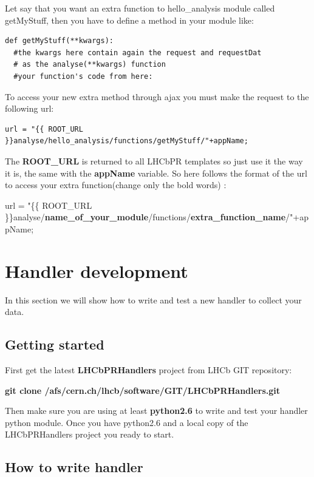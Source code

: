 \documentclass{lhcbnote}
\begin{document}
Let say that you want an extra function to hello\_analysis module called getMyStuff, then you have to define a method in your module like:

\begin{verbatim}
def getMyStuff(**kwargs):
  #the kwargs here contain again the request and requestDat
  # as the analyse(**kwargs) function
  #your function's code from here:
\end{verbatim}

To access your new extra method through ajax you must make the request to the following url:

\begin{verbatim}
url = "{{ ROOT_URL }}analyse/hello_analysis/functions/getMyStuff/"+appName;
\end{verbatim}
The {\bf ROOT\_URL} is returned to all LHCbPR templates so just use it the way it is, the same with the {\bf appName} variable.
So here follows the format of the url to access your extra function(change only the bold words) :

\vspace{2 mm}

url = "\{\{ ROOT\_URL \}\}analyse/{\bf name\_of\_your\_module}/functions/{\bf extra\_function\_name}/"+appName;

\section{Handler development}

In this section we will show how to write and test a new handler to collect your data.

\subsection{Getting started}

First get the latest {\bf LHCbPRHandlers} project from LHCb GIT repository:

\vspace{2 mm}

{\bf git clone /afs/cern.ch/lhcb/software/GIT/LHCbPRHandlers.git}

\vspace{2 mm}

Then make sure you are using at least {\bf python2.6} to write and test your handler python module.
Once you have python2.6 and a local copy of the LHCbPRHandlers project you ready to start.

\subsection{How to write handler}
\end{document}

